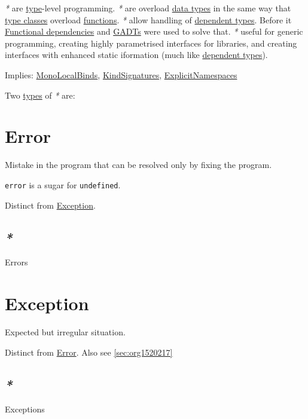\documentclass[a4paper,14pt,oneside]{book}
\begin{document}
\emph{*} are \hyperref[orgaa4a18b]{type}-level programming.
\emph{*} are overload \hyperref[org055bf4c]{data types} in the same way that \hyperref[org6ed66c3]{type classes} overload \hyperref[orge13d971]{functions}.
\emph{*} allow handling of \hyperref[orgcebcf5d]{dependent types}. Before it \hyperref[org8fbeb1f]{Functional dependencies} and \hyperref[org0624a4a]{GADTs} were used to solve that.
\emph{*} useful for generic programming, creating highly parametrised interfaces for libraries, and creating interfaces with enhanced static iformation (much like \hyperref[orgcebcf5d]{dependent types}).

Implies: \hyperref[org2225e72]{MonoLocalBinds}, \hyperref[org9842a6e]{KindSignatures}, \hyperref[org72f2781]{ExplicitNamespaces}

Two \hyperref[org6c15f12]{types} of \emph{*} are:

\chapter{\label{org5a50a3b}Error}
\label{sec:org0d162f9}
Mistake in the program that can be resolved only by fixing the program.

\texttt{error} is a sugar for \texttt{undefined}.

Distinct from \hyperref[orgc5e1e25]{Exception}.

\section{\emph{*}}
\label{sec:orga7e9e98}

\label{org046f5ee}Errors

\chapter{\label{orgc5e1e25}Exception}
\label{sec:org3d2cbaa}
Expected but irregular situation.

Distinct from \hyperref[org5a50a3b]{Error}. Also see \ref{sec:org1520217}

\section{\emph{*}}
\label{sec:org18f074d}

\label{org778e70c}Exceptions
\end{document}
